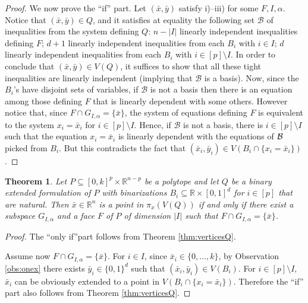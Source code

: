 \documentclass[11pt,a4paper]{article}
\newtheorem{theorem}{Theorem}[section]
\newcommand{\B}{\mathcal{B}}
\newcommand{\R}{\mathbb{R}}
\newcommand{\1}{\textbf{1}}
\begin{document}
\begin{proof}
    We now prove the ``if'' part.
    Let $(\bar{x},\bar{y})$ satisfy i)--iii) for some $F, I,\alpha$. Notice that $(\bar{x},\bar{y})\in Q$, and it satisfies at equality the following set $\B$ of inequalities from the system defining $Q$: $n-|I|$ linearly independent inequalities defining $F$; $d+1$ linearly independent inequalities from each $B_i$ with $i\in I$; $d$ linearly independent inequalities from each $B_i$ with $i\in[p]\setminus I$. In order to conclude that $(\bar{x},\bar{y})\in V(Q)$, it suffices to show that all these tight inequalities are linearly independent (implying that $\B$ is a basis). Now, since the $B_i$'s have disjoint sets of variables, if $\B$ is not a basis then there is an equation among those defining $F$ that is linearly dependent with some others. However notice that, since $ F\cap G_{I,\alpha}=\{\bar{x}\}$, the system of equations defining $F$ is equivalent to the system $x_i=\bar{x}_i$ for $i\in [p]\setminus I$. Hence, if $\B$ is not a basis, there is $i \in[p]\setminus I$ such that the equation $x_i=\bar{x}_i$ is linearly dependent with the equations of $\cal B$ picked from $B_i$. But this contradicts the fact that $(\bar{x}_i,\bar{y}_i)\in V(B_i\cap\{x_i=\bar{x}_i\})$. 
    \end{proof}


\begin{theorem}\label{thm:vertices}
Let $P\subseteq [0,k]^p\times \R^{n-p}$ be a polytope and let $Q$ be a binary extended formulation of $P$ with binarizations $B_i\subseteq \R\times [0,1]^d$ for $i\in [p]$ that are natural. Then $\bar{x}\in \R^n$ is a point in  $\pi_x(V(Q))$ if and only if there exist a subspace $G_{I,\alpha}$ and a face $F$ of $P$ of dimension $|I|$ such that
$F\cap G_{I,\alpha}=\{\bar{x}\}$.

\end{theorem}


\begin{proof}
The ``only if''part follows from Theorem \ref{thm:verticesQ}. 

Assume now $F\cap G_{I,\alpha}=\{\bar{x}\}$. For $i\in I$, since $\bar{x}_i\in \{0,\dots,k\}$, by Observation \ref{obs:onex} there exists $\bar{y}_i\in \{0,1\}^{d}$ such that $(\bar{x}_i,\bar{y}_i)\in V(B_i)$. For $i\in[p]\setminus I$, $\bar{x}_i$ can be obviously extended to a point in  $V(B_i\cap\{x_i=\bar{x}_i\})$.  Therefore the ``if'' part also follows from Theorem \ref{thm:verticesQ}.
\end{proof}
\end{document}
